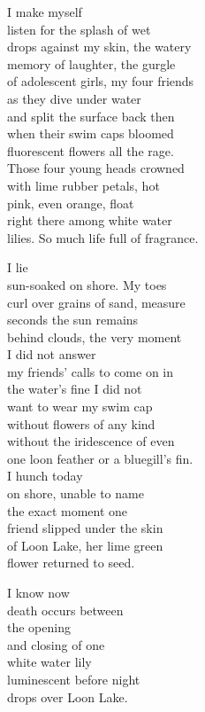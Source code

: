 \documentclass[twoside,10pt]{book}
\begin{document}
I make myself\\
listen for the splash of wet\\
drops against my skin, the watery\\
memory of laughter, the gurgle\\
of adolescent girls, my four friends\\
as they dive under water\\
and split the surface back then\\
when their swim caps bloomed\\
fluorescent flowers all the rage.\\
Those four young heads crowned\\
with lime rubber petals, hot\\
pink, even orange, float\\
right there among white water\\
lilies. So much life full of fragrance.

I lie\\
sun-soaked on shore. My toes\\
curl over grains of sand, measure\\
seconds the sun remains\\
behind clouds, the very moment\\
I did not answer\\
my friends' calls to come on in\\
the water's fine I did not\\
want to wear my swim cap\\
without flowers of any kind\\
without the iridescence of even\\
one loon feather or a bluegill's fin.\\
I hunch today\\
on shore, unable to name\\
the exact moment one\\
friend slipped under the skin\\
of Loon Lake, her lime green\\
flower returned to seed.

I know now\\
death occurs between\\
the opening\\
and closing of one\\
white water lily\\
luminescent before night\\
drops over Loon Lake.
\end{document}

